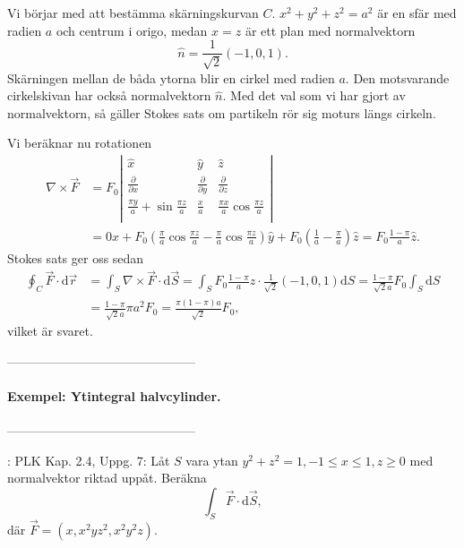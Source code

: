 \documentclass[%
oneside,                 %
final,                   %
10pt]{article}
\newcommand{\shortinlinecomment}[3]{{\color{red}{\bf #1}: #2}}
\begin{document}
Vi börjar med att bestämma skärningskurvan $C$.  $x^2 + y^2 + z^2 = a^2$ är en sfär med radien $a$ och centrum i origo, medan $x = z$ är ett plan med normalvektorn
\begin{equation}
  \hat{n} = \frac{1}{\sqrt{2}} \left(-1,0,1\right).
\end{equation}
Skärningen mellan de båda ytorna blir en cirkel med radien $a$.  Den motsvarande cirkelskivan har också normalvektorn $\hat{n}$.  Med det val som vi har gjort av normalvektorn, så gäller Stokes sats om partikeln rör sig moturs längs cirkeln.

Vi beräknar nu rotationen 
\begin{align}
  \nabla \times \vec{F} &= F_0 \left|\begin{array}{ccc}
\hat{x} & \hat{y} & \hat{z} \\
\frac{\partial}{\partial x} & \frac{\partial}{\partial y} &
\frac{\partial}{\partial z} \\
\frac{\pi y}{a} + \sin \frac{\pi z}{a} & \frac{x}{a} & \frac{\pi x}{a}
\cos \frac{\pi z}{a} \\
\end{array} 
\right|  \nonumber \\
&= 0 \hat{x} + F_0 \left(\frac{\pi}{a} \cos\frac{\pi z}{a} - \frac{\pi}{a}
\cos\frac{\pi z}{a}\right) \hat{y} + F_0\left(\frac{1}{a} - \frac{\pi}{a}
\right) \hat{z} = F_0 \frac{1 - \pi}{a} \hat{z}.
\end{align}
Stokes sats ger oss sedan
\begin{align}
  \oint_C \vec{F} \cdot \mbox{d}\vec{r} &= \int_S \nabla \times \vec{F} \cdot \mbox{d}
\vec{S} = \int_S F_0 \frac{1 - \pi}{a} \hat{z} \cdot \frac{1}{\sqrt{2}} 
\left(-1,0,1\right) \mbox{d}S = \frac{1 - \pi}{\sqrt{2}a} F_0
\int_S \mbox{d}S \nonumber \\ 
&= \frac{1 - \pi}{\sqrt{2}a} \pi a^2 F_0 =  \frac{\pi \left(1-\pi\right)a}{\sqrt{2}} F_0,
\end{align}
vilket är svaret.

---------------------------------------------

\paragraph{Exempel: Ytintegral halvcylinder.}
---------------------------------------------

\shortinlinecomment{Comment 4}{ PLK Kap. 2.4, Uppg. 7: }{ PLK Kap. 2.4, Uppg. }  Låt $S$ vara ytan $y^2 + z^2 = 1, -1 \le x \le 1, z \ge 0$ med normalvektor riktad uppåt.  Beräkna 
\begin{equation}
  \int_S \vec{F} \cdot \mbox{d}\vec{S},
\end{equation}
där $\vec{F} = \left( x, x^2yz^2, x^2 y^2 z\right)$.
\end{document}
